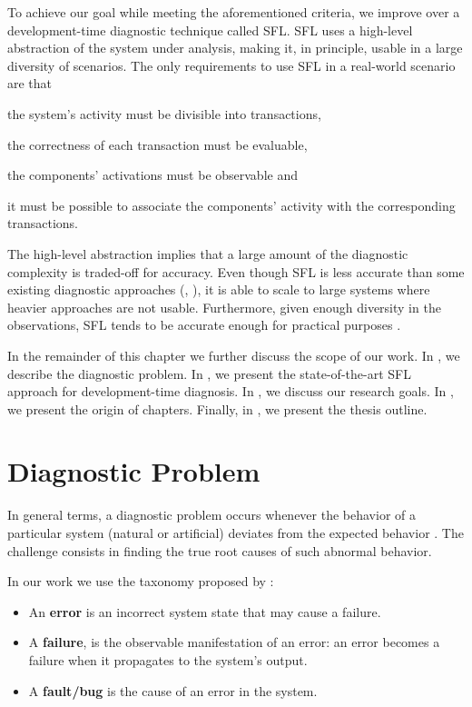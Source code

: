 To achieve our goal while meeting the aforementioned criteria, we
improve over a development-time diagnostic technique called \ac{SFL}.
%
\ac{SFL} uses a high-level abstraction of the system under analysis,
making it, in principle, usable in a large diversity of scenarios.
%
The only requirements to use \ac{SFL} in a real-world scenario are
that
\begin{inparaenum}[(1)]
\item the system's activity must be divisible into transactions,
\item the correctness of each transaction must be evaluable,
\item the components' activations must be observable and
\item it must be possible to associate the components' activity with
  the corresponding transactions.
\end{inparaenum}

The high-level abstraction implies that a large amount of the
diagnostic complexity is traded-off for accuracy.
%
Even though \ac{SFL} is less accurate than some existing diagnostic
approaches (\eg, \citep{Reiter87,Kleer87,Mayer03,Wotawa02}), it is able to
scale to large systems where heavier approaches are not usable.
%
Furthermore, given enough diversity in the observations, \ac{SFL}
tends to be accurate enough for practical
purposes \citep{Santelices09,Abreu09f}.


In the remainder of this chapter we further discuss the scope of our
work.
%
In , we describe the
diagnostic problem.
%
In , we present the state-of-the-art
\ac{SFL} approach for development-time diagnosis.
%
In , we discuss our research
goals.
%
In , we present the origin of
chapters.
%
Finally, in , we present the thesis
outline.

\section{Diagnostic Problem}
\label{sec:intro:diagnostic-problem}
In general terms, a diagnostic problem occurs whenever the behavior of
a particular system (natural or artificial) deviates from the expected
behavior \citep{Reiter87,Kleer92}.
%
The challenge consists in finding the true root causes of such
abnormal behavior.
%

In our work we use the taxonomy proposed by \citep{Avizienis04}:
\begin{itemize}
\item An \textbf{error} is an incorrect system state that may cause a
  failure.
\item A \textbf{failure}, is the observable manifestation of an error:
  an error becomes a failure when it propagates to the system's output.
\item A \textbf{fault/bug} is the cause of an error in the system.
\end{itemize}

